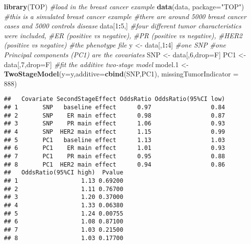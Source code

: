 \documentclass[11pt,]{article}
\newenvironment{Shaded}{\begin{snugshade}}{\end{snugshade}}
\newcommand{\CommentTok}[1]{\textcolor[rgb]{0.56,0.35,0.01}{\textit{#1}}}
\newcommand{\DataTypeTok}[1]{\textcolor[rgb]{0.13,0.29,0.53}{#1}}
\newcommand{\DecValTok}[1]{\textcolor[rgb]{0.00,0.00,0.81}{#1}}
\newcommand{\FloatTok}[1]{\textcolor[rgb]{0.00,0.00,0.81}{#1}}
\newcommand{\KeywordTok}[1]{\textcolor[rgb]{0.13,0.29,0.53}{\textbf{#1}}}
\newcommand{\NormalTok}[1]{#1}
\newcommand{\OperatorTok}[1]{\textcolor[rgb]{0.81,0.36,0.00}{\textbf{#1}}}
\newcommand{\StringTok}[1]{\textcolor[rgb]{0.31,0.60,0.02}{#1}}
\begin{document}
\begin{Shaded}
\begin{Highlighting}[]
\KeywordTok{library}\NormalTok{(TOP)}
\CommentTok{#load in the breast cancer example}
\KeywordTok{data}\NormalTok{(data, }\DataTypeTok{package=}\StringTok{"TOP"}\NormalTok{)}
\CommentTok{#this is a simulated breast cancer example}
\CommentTok{#there are around 5000 breast cancer cases and 5000 controls disease}
\NormalTok{data[}\DecValTok{1}\OperatorTok{:}\DecValTok{5}\NormalTok{,]}
\CommentTok{#four different tumor characteristics were included, }
\CommentTok{#ER (positive vs negative), }
\CommentTok{#PR (positive vs negative),}
\CommentTok{#HER2 (positive vs negative)}
\CommentTok{#the phenotype file}
\NormalTok{y <-}\StringTok{ }\NormalTok{data[,}\DecValTok{1}\OperatorTok{:}\DecValTok{4}\NormalTok{]}
\CommentTok{#one SNP}
\CommentTok{#one Principal components (PC1) are the covariates}
\NormalTok{SNP <-}\StringTok{ }\NormalTok{data[,}\DecValTok{6}\NormalTok{,drop=F]}
\NormalTok{PC1 <-}\StringTok{ }\NormalTok{data[,}\DecValTok{7}\NormalTok{,drop=F]}
\CommentTok{#fit the additive two-stage model}
\NormalTok{model}\FloatTok{.1}\NormalTok{ <-}\StringTok{ }\KeywordTok{TwoStageModel}\NormalTok{(}\DataTypeTok{y=}\NormalTok{y,}\DataTypeTok{additive=}\KeywordTok{cbind}\NormalTok{(SNP,PC1),}
                         \DataTypeTok{missingTumorIndicator =} \DecValTok{888}\NormalTok{)}
\end{Highlighting}
\end{Shaded}

\begin{Shaded}
\end{Shaded}

\begin{verbatim}
##   Covariate SecondStageEffect OddsRatio OddsRatio(95%CI low)
## 1       SNP   baseline effect      0.97                 0.84
## 2       SNP    ER main effect      0.98                 0.87
## 3       SNP    PR main effect      1.06                 0.93
## 4       SNP  HER2 main effect      1.15                 0.99
## 5       PC1   baseline effect      1.13                 1.03
## 6       PC1    ER main effect      1.01                 0.93
## 7       PC1    PR main effect      0.95                 0.88
## 8       PC1  HER2 main effect      0.94                 0.86
##   OddsRatio(95%CI high)  Pvalue
## 1                  1.13 0.69200
## 2                  1.11 0.76700
## 3                  1.20 0.37000
## 4                  1.33 0.06380
## 5                  1.24 0.00755
## 6                  1.08 0.87100
## 7                  1.03 0.21500
## 8                  1.03 0.17700
\end{verbatim}
\end{document}
